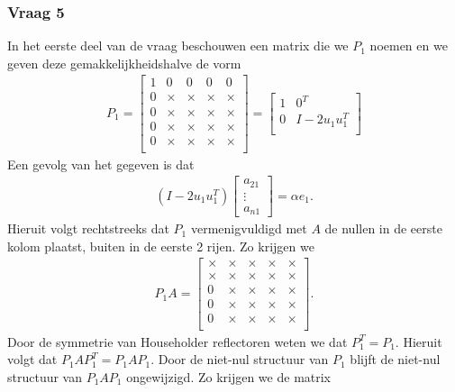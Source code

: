 \documentclass{article}
\begin{document}
\subsubsection*{Vraag 5}
In het eerste deel van de vraag beschouwen een matrix die we $P_1$ noemen en we geven deze gemakkelijkheidshalve de vorm
\begin{align*}
    P_1=
    \begin{bmatrix}
    1 & 0 & 0 & 0 & 0\\
    0 & \times & \times & \times & \times\\
    0 & \times & \times & \times & \times\\
    0 & \times & \times & \times & \times\\
    0 & \times & \times & \times & \times\\
    \end{bmatrix}
    =
    \begin{bmatrix}
    1 & 0^T\\
    0 & I-2u_1u_1^T\\
    \end{bmatrix}
\end{align*}
Een gevolg van het gegeven is dat
\begin{align*}
    (I-2u_1u_1^T)\begin{bmatrix}a_{21}\\\vdots\\a_{n1}\end{bmatrix}=\alpha e_1.
\end{align*}
Hieruit volgt rechtstreeks dat $P_1$ vermenigvuldigd met $A$ de nullen in de eerste kolom plaatst, buiten in de eerste 2 rijen. Zo krijgen we
\begin{align*}
    P_1A=
    \begin{bmatrix}
    \times & \times & \times & \times & \times\\
    \times & \times & \times & \times & \times\\
    0 & \times & \times & \times & \times\\
    0 & \times & \times & \times & \times\\
    0 & \times & \times & \times & \times\\
    \end{bmatrix}.
\end{align*}
Door de symmetrie van Householder reflectoren weten we dat $P_1^T=P_1$. Hieruit volgt dat $P_1AP_1^T=P_1AP_1$. Door de niet-nul structuur van $P_1$ blijft de niet-nul structuur van $P_1AP_1$ ongewijzigd. Zo krijgen we de matrix
\end{document}
